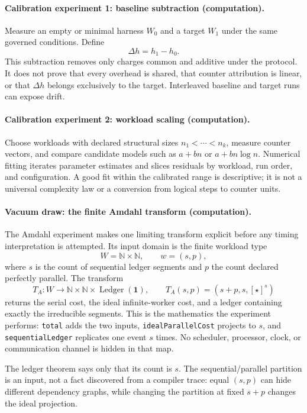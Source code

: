 \paragraph{Calibration experiment 1: baseline subtraction (computation).}
Measure an empty or minimal harness \(W_0\) and a target \(W_1\) under the same governed conditions.  Define
\[
                         \Delta h=h_1-h_0.
\]
This subtraction removes only charges common and additive under the protocol.  It does not prove that every overhead
is shared, that counter attribution is linear, or that \(\Delta h\) belongs exclusively to the target.  Interleaved
baseline and target runs can expose drift.

\paragraph{Calibration experiment 2: workload scaling (computation).}
Choose workloads with declared structural sizes \(n_1<\cdots<n_k\), measure counter vectors, and compare candidate
models such as \(a+bn\) or \(a+bn\log n\).  Numerical fitting iterates parameter estimates and slices residuals by
workload, run order, and configuration.  A good fit within the calibrated range is descriptive; it is not a universal
complexity law or a conversion from logical steps to counter units.

\paragraph{Vacuum draw: the finite Amdahl transform (computation).}
The Amdahl experiment makes one limiting transform explicit before any timing interpretation is attempted.  Its input
domain is the finite workload type
\[
                         W=\mathbb N\times\mathbb N,\qquad w=(s,p),
\]
where \(s\) is the count of sequential ledger segments and \(p\) the count declared perfectly parallel.  The
transform
\[
 T_A:W\longrightarrow\mathbb N\times\mathbb N\times\operatorname{Ledger}(\mathbf 1),\qquad
 T_A(s,p)=(s+p, s, [\star]^s)
\]
returns the serial cost, the ideal infinite-worker cost, and a ledger containing exactly the irreducible segments.
This is the mathematics the experiment performs: \texttt{total} adds the two inputs, \texttt{idealParallelCost} projects to \(s\),
and \texttt{sequentialLedger} replicates one event \(s\) times.  No scheduler, processor, clock, or communication channel is
hidden in that map.

The ledger theorem says only that its count is \(s\).  The sequential/parallel partition is an input, not a fact
discovered from a compiler trace: equal \((s,p)\) can hide different dependency graphs, while changing the partition
at fixed \(s+p\) changes the ideal projection.

